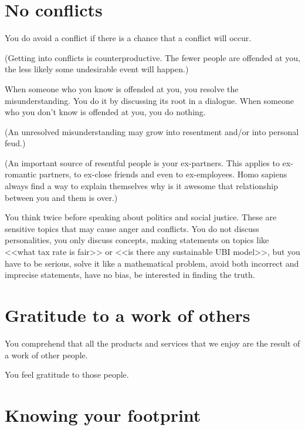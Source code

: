 \documentclass[11pt]{article}
\theoremstyle{remark}
\theoremstyle{definition}
\begin{document}
\section{No conflicts}




You do avoid a conflict if there is a chance that a conflict will occur.
 
(Getting into conflicts is counterproductive. The fewer people are offended at you, the less likely some undesirable event will happen.) 

When someone who you know is offended at you, you resolve the misunderstanding. You do it by discussing its root in a dialogue. When someone who you don't know is offended at you, you do nothing.

(An unresolved misunderstanding may grow into resentment and/or into personal feud.)



(An important source of resentful people is your ex-partners. This applies to ex-romantic partners, to ex-close friends and even to ex-employees. Homo sapiens always find a way to explain themselves why is it awesome that relationship between you and them is over.)



You think twice before speaking about politics and social justice. These are sensitive topics that may cause anger and conflicts. You do not discuss personalities, you only discuss concepts, making statements on topics like <<what tax rate is fair>> or <<is there any sustainable UBI model>>, but you have to be serious, solve it like a mathematical problem, avoid both incorrect and imprecise statements, have no bias, be interested in finding the truth.








\section{Gratitude to a work of others}


You comprehend that all the products and services that we enjoy are the result of a work of other people. 

You feel gratitude to those people.






\section{Knowing your footprint}
\end{document}
